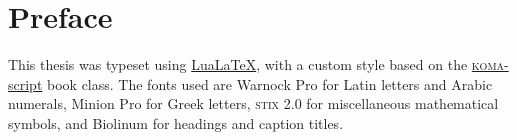 \chapter*{Preface}\noindent
\lipsum

This thesis was typeset using \href{http://www.luatex.org/}{LuaLaTeX}, with a custom style based on the \href{https://ctan.org/pkg/koma-script?lang=en}{\textsc{koma}-script} book class.
The fonts used are Warnock Pro for Latin letters and Arabic numerals, Minion Pro for Greek letters, \textsc{stix} 2.0 for miscellaneous mathematical symbols, and Biolinum for headings and caption titles.
